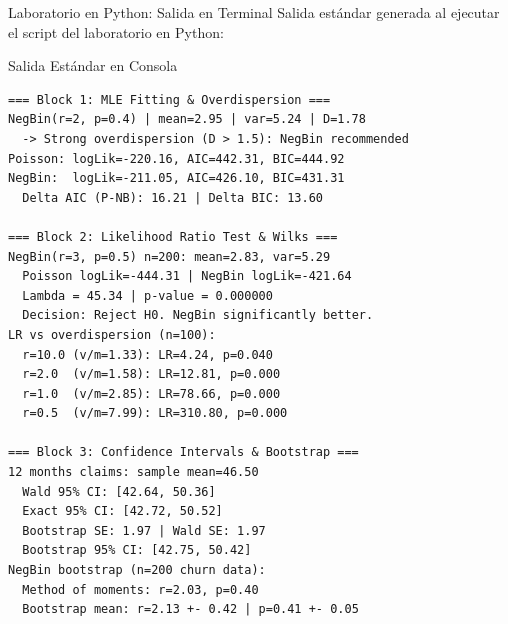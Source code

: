 \documentclass[10pt, aspectratio=169]{beamer}
\begin{document}
\begin{frame}[fragile]{Laboratorio en Python: Salida en Terminal}
  \scriptsize
  Salida estándar generada al ejecutar el script del laboratorio en Python:
  \vspace{0.02cm}
  \begin{block}{Salida Estándar en Consola}
    \fontsize{4pt}{5pt}\selectfont
    \begin{verbatim}
=== Block 1: MLE Fitting & Overdispersion ===
NegBin(r=2, p=0.4) | mean=2.95 | var=5.24 | D=1.78
  -> Strong overdispersion (D > 1.5): NegBin recommended
Poisson: logLik=-220.16, AIC=442.31, BIC=444.92
NegBin:  logLik=-211.05, AIC=426.10, BIC=431.31
  Delta AIC (P-NB): 16.21 | Delta BIC: 13.60

=== Block 2: Likelihood Ratio Test & Wilks ===
NegBin(r=3, p=0.5) n=200: mean=2.83, var=5.29
  Poisson logLik=-444.31 | NegBin logLik=-421.64
  Lambda = 45.34 | p-value = 0.000000
  Decision: Reject H0. NegBin significantly better.
LR vs overdispersion (n=100):
  r=10.0 (v/m=1.33): LR=4.24, p=0.040
  r=2.0  (v/m=1.58): LR=12.81, p=0.000
  r=1.0  (v/m=2.85): LR=78.66, p=0.000
  r=0.5  (v/m=7.99): LR=310.80, p=0.000

=== Block 3: Confidence Intervals & Bootstrap ===
12 months claims: sample mean=46.50
  Wald 95% CI: [42.64, 50.36]
  Exact 95% CI: [42.72, 50.52]
  Bootstrap SE: 1.97 | Wald SE: 1.97
  Bootstrap 95% CI: [42.75, 50.42]
NegBin bootstrap (n=200 churn data):
  Method of moments: r=2.03, p=0.40
  Bootstrap mean: r=2.13 +- 0.42 | p=0.41 +- 0.05
    \end{verbatim}
  \end{block}
\end{frame}
\end{document}
